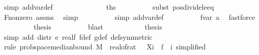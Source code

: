 \begin{isabellebody}
\ {\isacharparenleft}{\kern0pt}simp\ add{\isacharcolon}{\kern0pt}var{\isacharunderscore}{\kern0pt}def{\isacharparenright}{\kern0pt}\isanewline
\ \ \ \ \ \ \isamarkupfalse%
\ \ \isamarkupfalse%
\ {\isachardoublequoteopen}{\isachardot}{\kern0pt}{\isachardot}{\kern0pt}{\isachardot}{\kern0pt}\ {\isasymle}\ {}{\isacharslash}{\kern0pt}{}{\isachardoublequoteclose}\ {\isacharparenleft}{\kern0pt}\ {\isacharquery}{\kern0pt}ths{\isacharparenright}{\kern0pt}\isanewline
\ \ \ \ \ \ \ \ \isamarkupfalse%
\ {\isacharparenleft}{\kern0pt}subst\ pos{\isacharunderscore}{\kern0pt}divide{\isacharunderscore}{\kern0pt}le{\isacharunderscore}{\kern0pt}eq\ {\isacharparenright}{\kern0pt}\isanewline
\ \ \ \ \ \ \ \ \isamarkupfalse%
\ F{\isacharunderscore}{\kern0pt}{}{\isacharunderscore}{\kern0pt}nonzero\ assms{\isacharparenleft}{\kern0pt}{}{\isacharparenright}{\kern0pt}\ \isamarkupfalse%
\ simp\isanewline
\ \ \ \ \ \ \ \ \isamarkupfalse%
\ {\isacharparenleft}{\kern0pt}simp\ add{\isacharcolon}{\kern0pt}var{\isacharunderscore}{\kern0pt}def{\isacharparenright}{\kern0pt}\isanewline
\ \ \ \ \ \ \ \ \isamarkupfalse%
\ f{}{\isacharunderscore}{\kern0pt}var{\isacharprime}{\kern0pt}{\isacharprime}{\kern0pt}\ a\ \isamarkupfalse%
\ fastforce\isanewline
\ \ \ \ \ \ \isamarkupfalse%
\ \isamarkupfalse%
\ {\isacharquery}{\kern0pt}thesis\isanewline
\ \ \ \ \ \ \ \ \isamarkupfalse%
\ blast\isanewline
\ \ \ \ \isamarkupfalse%
\isanewline
\ \ \isamarkupfalse%
\isanewline
\isanewline
\ \ \isamarkupfalse%
\ {\isacharquery}{\kern0pt}thesis\isanewline
\ \ \ \ \isamarkupfalse%
\ {\isacharparenleft}{\kern0pt}simp\ add{\isacharcolon}{\kern0pt}\ distr{\isacharprime}{\kern0pt}\ e\ real{\isacharunderscore}{\kern0pt}f\ f{\isacharprime}{\kern0pt}{\isacharunderscore}{\kern0pt}def\ g{\isacharunderscore}{\kern0pt}def\ {\isasymOmega}def{\isacharbrackleft}{\kern0pt}symmetric{\isacharbrackright}{\kern0pt}{\isacharparenright}{\kern0pt}\isanewline
\ \ \ \ \isamarkupfalse%
\ {\isacharparenleft}{\kern0pt}rule\ prob{\isacharunderscore}{\kern0pt}space{\isachardot}{\kern0pt}median{\isacharunderscore}{\kern0pt}bound{\isacharunderscore}{\kern0pt}{}{\isacharbrackleft}{\kern0pt}\ M{\isacharequal}{\kern0pt}{\isachardoublequoteopen}{\isasymOmega}\ \ {\isasymepsilon}{\isacharequal}{\kern0pt}{\isachardoublequoteopen}real{\isacharunderscore}{\kern0pt}of{\isacharunderscore}{\kern0pt}rat\ {\isasymepsilon}{\isachardoublequoteclose}\ \ X{\isacharequal}{\kern0pt}{\isachardoublequoteopen}{\isacharparenleft}{\kern0pt}{\isasymlambda}i\ {\isasymomega}{\isachardot}{\kern0pt}\ f{}\ {\isasymomega}\ i{\isacharparenright}{\kern0pt}{\isachardoublequoteclose}{\isacharcomma}{\kern0pt}\ simplified{\isacharbrackright}{\kern0pt}{\isacharparenright}{\kern0pt}\isanewline

\end{isabellebody}
